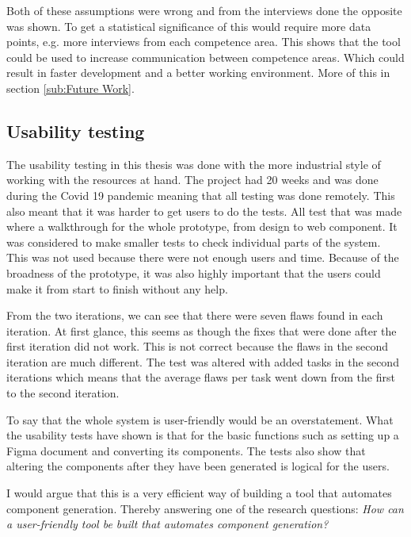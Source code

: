 Both of these assumptions were wrong and from the interviews done the opposite was shown. To get a statistical significance of this would require more data points, e.g. more interviews from each competence area. This shows that the tool could be used to increase communication between competence areas. Which could result in faster development and a better working environment. More of this in section \ref{sub:Future Work}.

\subsection{Usability testing}%
\label{sub:Usability testing}
The usability testing in this thesis was done with the more industrial style of working with the resources at hand. The project had 20 weeks and was done during the Covid 19 pandemic meaning that all testing was done remotely. This also meant that it was harder to get users to do the tests. All test that was made where a walkthrough for the whole prototype, from design to web component. It was considered to make smaller tests to check individual parts of the system. This was not used because there were not enough users and time. Because of the broadness of the prototype, it was also highly important that the users could make it from start to finish without any help. 

From the two iterations, we can see that there were seven flaws found in each iteration. At first glance, this seems as though the fixes that were done after the first iteration did not work. This is not correct because the flaws in the second iteration are much different. The test was altered with added tasks in the second iterations which means that the average flaws per task went down from the first to the second iteration. 

To say that the whole system is user-friendly would be an overstatement. What the usability tests have shown is that for the basic functions such as setting up a Figma document and converting its components. The tests also show that altering the components after they have been generated is logical for the users. 

I would argue that this is a very efficient way of building a tool that automates component generation. Thereby answering one of the research questions: \textit{How can a user-friendly tool be built that automates component generation?}



